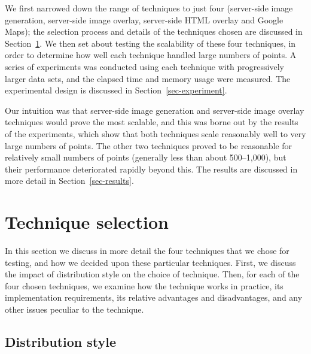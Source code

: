 \documentclass[acmtocl,acmnow]{acmtrans2m}
\begin{document}
We first narrowed down the range of techniques to just four (server-side
image generation, server-side image overlay, server-side HTML overlay
and Google Maps); the selection process and details of the techniques
chosen are discussed in Section~\ref{sec-techniques}. We then set about
testing the scalability of these four techniques, in order to determine
how well each technique handled large numbers of points. A series of
experiments was conducted using each technique with progressively larger
data sets, and the elapsed time and memory usage were measured. The
experimental design is discussed in Section~\ref{sec-experiment}.

Our intuition was that server-side image generation and server-side
image overlay techniques would prove the most scalable, and this was
borne out by the results of the experiments, which show that both
techniques scale reasonably well to very large numbers of points. The
other two techniques proved to be reasonable for relatively small
numbers of points (generally less than about 500--1,000), but their
performance deteriorated rapidly beyond this. The results are discussed
in more detail in Section~\ref{sec-results}.


\section{Technique selection}
\label{sec-techniques}

In this section we discuss in more detail the four techniques that we
chose for testing, and how we decided upon these particular techniques.
First, we discuss the impact of distribution style on the choice of
technique. Then, for each of the four chosen techniques, we examine how
the technique works in practice, its implementation requirements, its
relative advantages and disadvantages, and any other issues peculiar to
the technique.


\subsection{Distribution style}
\label{sec-distribution}
\end{document}
